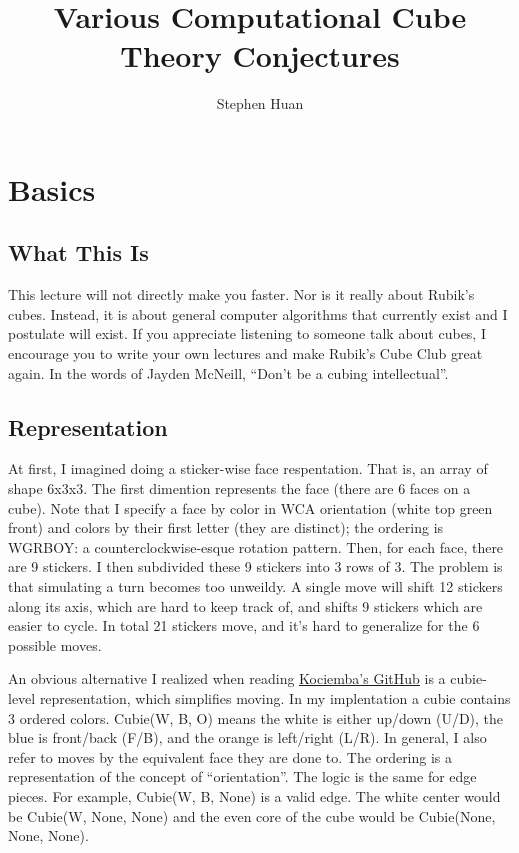 \documentclass[11pt, oneside]{article}
\title{Various Computational Cube Theory Conjectures}
\author{Stephen Huan}
\begin{document}
\maketitle

\section{Basics}
\subsection{What This Is}

This lecture will not directly make you faster. Nor is it really about Rubik's cubes.
Instead, it is about general computer algorithms that currently exist and I postulate will exist.
If you appreciate listening to someone talk about cubes, I encourage you to write your own lectures
and make Rubik's Cube Club great again. In the words of Jayden McNeill, ``Don't be a cubing intellectual''.

\subsection{Representation}

At first, I imagined doing a sticker-wise face respentation. That is, an array of shape 6x3x3.
The first dimention represents the face (there are 6 faces on a cube). Note that I specify a face by color in
WCA orientation (white top green front) and colors by their first letter (they are distinct); the ordering is WGRBOY: a counterclockwise-esque rotation pattern. Then, for each face, there are 9 stickers. I then subdivided these 9 stickers
into 3 rows of 3. The problem is that simulating a turn becomes too unweildy. A single move will shift 12 stickers along its axis, which are hard to keep track of, and shifts 9 stickers which are easier to cycle. In total 21 stickers move, and it's hard to generalize for the 6 possible moves.

An obvious alternative I realized when reading \href{https://github.com/hkociemba/RubiksCube-TwophaseSolver}{Kociemba's GitHub} is a cubie-level representation, which simplifies moving.
In my implentation a cubie contains 3 ordered colors.
Cubie(W, B, O) means the white is either up/down (U/D), the blue is front/back (F/B), and the orange is left/right (L/R).
In general, I also refer to moves by the equivalent face they are done to.
The ordering is a representation of the concept of ``orientation''.
The logic is the same for edge pieces. For example, Cubie(W, B, None) is a valid edge.
The white center would be Cubie(W, None, None) and the even core of the cube would be Cubie(None, None, None).
\end{document}
